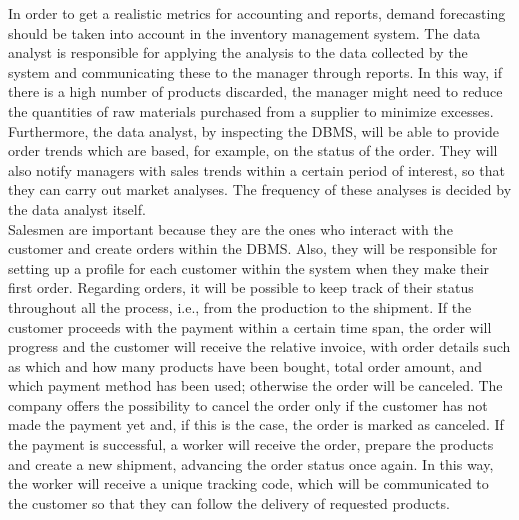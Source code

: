In order to get a realistic metrics for accounting and reports, demand forecasting should be taken into account in the inventory management system. The data analyst is responsible for applying the analysis to the data collected by the system and communicating these to the manager through reports. In this way, if there is a high number of products discarded, the manager might need to reduce the quantities of raw materials purchased from a supplier to minimize excesses. Furthermore, the data analyst, by inspecting the DBMS, will be able to provide order trends which are based, for example, on the status of the order. They will also notify managers with sales trends within a certain period of interest, so that they can carry out market analyses. The frequency of these analyses is decided by the data analyst itself.\\

Salesmen are important because they are the ones who interact with the customer and create orders within the DBMS. Also, they will be responsible for setting up a profile for each customer within the system when they make their first order. Regarding orders, it will be possible to keep track of their status throughout all the process, i.e., from the production to the shipment. If the customer proceeds with the payment within a certain time span, the order will progress and the customer will receive the relative invoice, with order details such as which and how many products have been bought, total order amount, and which payment method has been used; otherwise the order will be canceled. The company offers the possibility to cancel the order only if the customer has not made the payment yet and, if this is the case, the order is marked as canceled. If the payment is successful, a worker will receive the order, prepare the products and create a new shipment, advancing the order status once again. In this way, the worker will receive a unique tracking code, which will be communicated to the customer so that they can follow the delivery of requested products. \\

